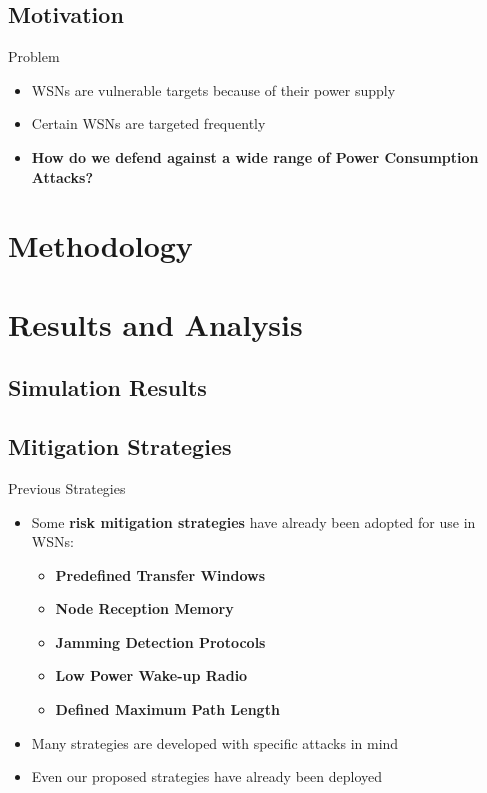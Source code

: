 \documentclass{beamer}
\begin{document}

\subsection{Motivation}

\begin{frame}{Problem}
\begin{itemize}

	\item WSNs are vulnerable targets because of their power supply
	\item Certain WSNs are targeted frequently
	\item \textbf{How do we defend against a wide range of Power Consumption Attacks?}
	
\end{itemize}
\end{frame}

\section{Methodology}

\section{Results and Analysis}

\subsection{Simulation Results}

\subsection{Mitigation Strategies}

\begin{frame}{Previous Strategies}

\begin{itemize}

	\item Some \textbf{risk mitigation strategies} have already been adopted for use in WSNs:
	\begin{itemize}
		\item \textbf{Predefined Transfer Windows}
		\item \textbf{Node Reception Memory}
		\item \textbf{Jamming Detection Protocols}
		\item \textbf{Low Power Wake-up Radio}
		\item \textbf{Defined Maximum Path Length}
	\end{itemize}
	\item Many strategies are developed with specific attacks in mind
	\item Even our proposed strategies have already been deployed
	
\end{itemize}

\end{frame}
\end{document}
